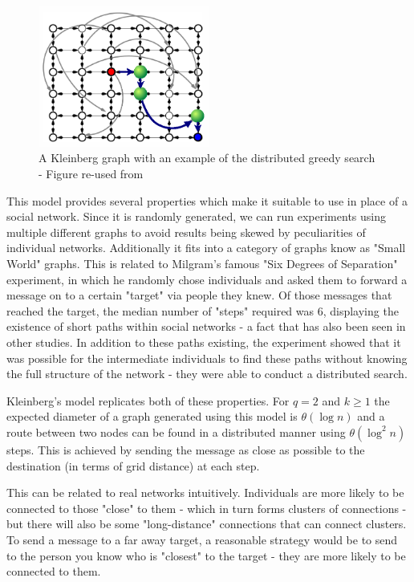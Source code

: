 \documentclass[bsc,frontabs,twoside,singlespacing,parskip,deptreport]{infthesis}     %
\begin{document}
\begin{figure}[ht]
  \centering
    \includegraphics[width=0.5\textwidth]{Schabanel11_Kleinbergs_Network}
  \caption{A Kleinberg graph with an example of the distributed greedy search - Figure re-used from \cite{Schabanel11}}
\end{figure}

This model provides several properties which make it suitable to use in place of a social network. Since it is randomly generated, we can run experiments using multiple different graphs to avoid results being skewed by peculiarities of individual networks. Additionally it fits into a category of graphs know as "Small World" graphs. This is related to Milgram's famous "Six Degrees of Separation" experiment\cite{Milgram67,TraversMilgram69}, in which he randomly chose individuals and asked them to forward a message on to a certain "target" via people they knew. Of those messages that reached the target, the median number of "steps" required was 6, displaying the existence of short paths within social networks - a fact that has also been seen in other studies\cite{MilgramBackup1,MilgramBackup2}. In addition to these paths existing, the experiment showed that it was possible for the intermediate individuals to find these paths without knowing the full structure of the network - they were able to conduct a distributed search. 

Kleinberg's model replicates both of these properties. For $q = 2$ and $k \ge 1$ the expected diameter of a graph generated using this model is $\theta (\log n)$ and a route between two nodes can be found in a distributed manner using $\theta (\log^{2}n)$ steps\cite{AnalyzingKleinberg}. This is achieved by sending the message as close as possible to the destination (in terms of grid distance) at each step.

This can be related to real networks intuitively. Individuals are more likely to be connected to those "close" to them - which in turn forms clusters of connections - but there will also be some "long-distance" connections that can connect clusters. To send a message to a far away target, a reasonable strategy would be to send to the person you know who is "closest" to the target - they are more likely to be connected to them.
\end{document}
